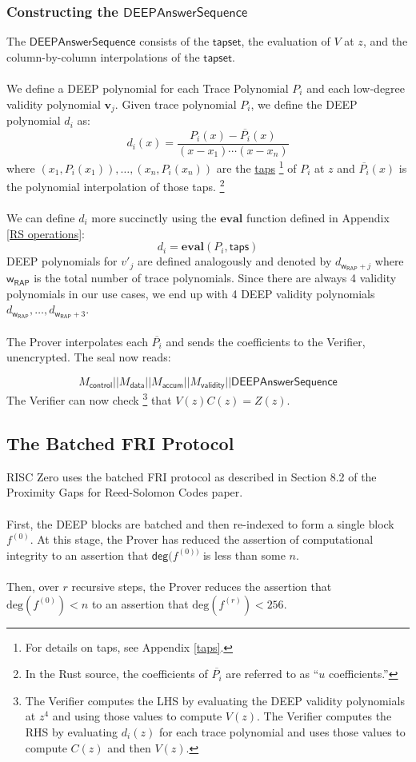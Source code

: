 \documentclass[10pt,letterpaper,titlepage]{article}
\theoremstyle{definition}
\begin{document}
\begin{appendices}
\subsubsection{Constructing the $\mathsf{DEEPAnswerSequence}$}
The $\mathsf{DEEPAnswerSequence}$ consists of the $\mathsf{tapset}$, the evaluation of $V$ at $z$, and the column-by-column interpolations of the $\mathsf{tapset}$.\\
\label{DEEP Polynomials}
\\
We define a DEEP polynomial for each Trace Polynomial $P_i$ and each low-degree validity polynomial $\mathbf{v}_j$. Given trace polynomial $P_i$, we define the DEEP polynomial $d_i$ as:
\[d_i(x)=\frac{P_i(x)-\overline{P_i}(x)}{(x-x_1)\cdots(x-x_n)}\]
where $(x_1,P_i(x_1)),\ldots,(x_n,P_i(x_n))$ are the \hyperref[taps]{taps}%
\footnote{For details on taps, see Appendix \ref*{taps}.}
of $P_i$ at $z$ and $\overline{P_i}(x)$ is the polynomial interpolation of those taps.%
\footnote{In the Rust source, the coefficients of $\overline{P_i}$ are referred to as ``$u$ coefficients.'' }
\\
\\
We can define $d_i$ more succinctly using the $\textbf{eval}$ function defined in Appendix \ref{RS operations}:
\[
  d_i=
  \mathbf{eval}(
    P_i,
    \mathsf{taps}
  )\]
DEEP polynomials for $v'_j$ are defined analogously and denoted by $d_{\mathsf{w}_\mathsf{RAP}+j}$ where $\mathsf{w}_\mathsf{RAP}$ is the total number of trace polynomials.
Since there are always 4 validity polynomials in our use cases, we end up with 4 DEEP validity polynomials $d_{\mathsf{w}_\mathsf{RAP}},\ldots,d_{\mathsf{w}_\mathsf{RAP}+3}$. \\
\\
The Prover interpolates each $\overline{P_i}$ and sends the coefficients to the Verifier, unencrypted. The seal now reads:

\[
  M_\mathsf{control}||
  M_\mathsf{data}||
  M_\mathsf{accum}||
  M_\mathsf{validity}||
  \mathsf{DEEPAnswerSequence}
\]
The Verifier can now check%
\footnote{
  The Verifier computes the LHS by evaluating the DEEP validity polynomials at $z^4$ and using those values to compute $V(z)$.
  The Verifier computes the RHS by evaluating $d_i(z)$ for each trace polynomial and uses those values to compute $C(z)$ and then $V(z)$.
  }
that $V(z)C(z)=Z(z)$.
\subsection{The Batched FRI Protocol}
\label{FRI}
RISC Zero uses the batched FRI protocol as described in Section 8.2 of the Proximity Gaps for Reed-Solomon Codes paper. \\
\\
First, the DEEP blocks are batched and then re-indexed to form a single block $f^{(0)}$.
At this stage, the Prover has reduced the assertion of computational integrity to an assertion that $\mathsf{deg}(f^{(0))}$ is less than some $n$. \\
\\
Then, over $r$ recursive steps, the Prover reduces the assertion that $\text{deg}(f^{(0)})<n$ to an assertion that $\text{deg}(f^{(r)})<256$.

\end{appendices}
\end{document}
